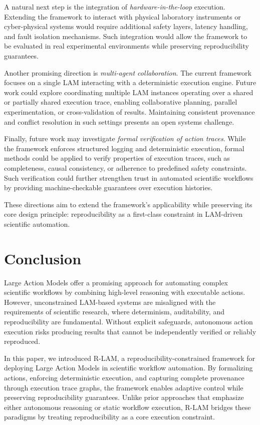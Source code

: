 \documentclass[conference]{IEEEtran}
\begin{document}
A natural next step is the integration of \emph{hardware-in-the-loop} execution. Extending the framework to interact with physical laboratory instruments or cyber-physical systems would require additional safety layers, latency handling, and fault isolation mechanisms. Such integration would allow the framework to be evaluated in real experimental environments while preserving reproducibility guarantees.

Another promising direction is \emph{multi-agent collaboration}. The current framework focuses on a single LAM interacting with a deterministic execution engine. Future work could explore coordinating multiple LAM instances operating over a shared or partially shared execution trace, enabling collaborative planning, parallel experimentation, or cross-validation of results. Maintaining consistent provenance and conflict resolution in such settings presents an open systems challenge.

Finally, future work may investigate \emph{formal verification of action traces}. While the framework enforces structured logging and deterministic execution, formal methods could be applied to verify properties of execution traces, such as completeness, causal consistency, or adherence to predefined safety constraints. Such verification could further strengthen trust in automated scientific workflows by providing machine-checkable guarantees over execution histories.

These directions aim to extend the framework’s applicability while preserving its core design principle: reproducibility as a first-class constraint in LAM-driven scientific automation.

\section{Conclusion}

Large Action Models offer a promising approach for automating complex scientific workflows by combining high-level reasoning with executable actions. However, unconstrained LAM-based systems are misaligned with the requirements of scientific research, where determinism, auditability, and reproducibility are fundamental. Without explicit safeguards, autonomous action execution risks producing results that cannot be independently verified or reliably reproduced.

In this paper, we introduced R-LAM, a reproducibility-constrained framework for deploying Large Action Models in scientific workflow automation. By formalizing actions, enforcing deterministic execution, and capturing complete provenance through execution trace graphs, the framework enables adaptive control while preserving reproducibility guarantees. Unlike prior approaches that emphasize either autonomous reasoning or static workflow execution, R-LAM bridges these paradigms by treating reproducibility as a core execution constraint.
\end{document}

